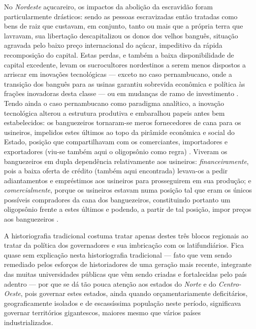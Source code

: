 No \textit{Nordeste} açucareiro, os impactos da abolição da escravidão foram particularmente drásticos: sendo as pessoas escravizadas então tratadas como bens de raiz que custavam, em conjunto, tanto ou mais que a própria terra que lavravam, sua libertação descapitalizou os donos dos velhos banguês, situação agravada pelo baixo preço internacional do açúcar, impeditivo da rápida recomposição do capital. Estas perdas, e também a baixa disponibilidade de capital excedente, levam os sucrocultores nordestinos a serem menos dispostos a arriscar em inovações tecnológicas --- exceto no caso pernambucano, onde a transição dos banguês para as usinas garantiu sobrevida econômica e política às frações inovadoras desta classe --- ou em mudanças de ramo de investimento \cite[p.~153]{CARONE1970inst}.   Tendo ainda o caso pernambucano como paradigma analítico, a inovação tecnológica alterou a estrutura produtiva e embaralhou papeis antes bem estabelecidos: os banguezeiros tornaram-se meros fornecedores de cana para os usineiros, impelidos estes últimos ao topo da pirâmide econômica e social do Estado, posição que compartilhavam com os comerciantes, importadores e exportadores (viu-se também aqui o oligopsônio como regra) \cite[p.~228]{perissinotto_cladom_1994}. Viveram os banguezeiros em dupla dependência relativamente aos usineiros: \textit{financeiramente}, pois a baixa oferta de crédito (também aqui encontrada) levava-os a pedir adiantamentos e empréstimos aos usineiros para prosseguirem em sua produção; e \textit{comercialmente}, porque os usineiros estavam numa posição tal que eram os únicos possíveis compradores da cana dos banguezeiros, constituindo portanto um oligopsônio frente a estes últimos e podendo, a partir de tal posição, impor preços aos banguezeiros \cite[pp.~228-229]{perissinotto_cladom_1994}.

A historiografia tradicional costuma tratar apenas destes três blocos regionais ao tratar da política dos governadores e sua imbricação com os latifundiários. Fica quase sem explicação nesta historiografia tradicional --- fato que vem sendo remediado pelos esforços de historiadores de uma geração mais recente, integrante das muitas universidades públicas que vêm sendo criadas e fortalecidas pelo país adentro --- por que se dá tão pouca atenção aos estados do \textit{Norte} e do \textit{Centro-Oeste}, pois governar estes estados, ainda quando orçamentariamente deficitários, geograficamente isolados e de escassíssima população neste período, significava governar territórios gigantescos, maiores mesmo que vários países industrializados. 

